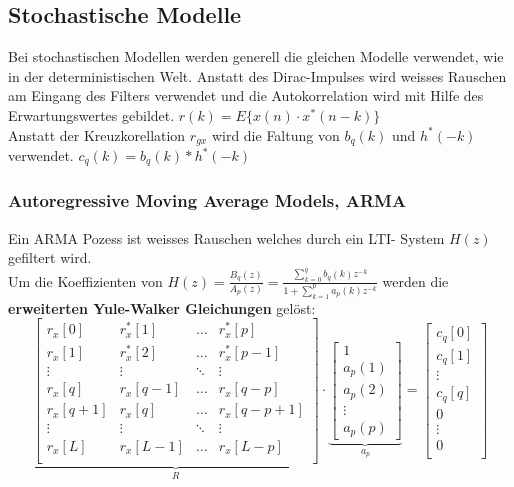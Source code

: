 \subsection{Stochastische Modelle}
Bei stochastischen Modellen werden generell die gleichen Modelle verwendet, wie in der deterministischen Welt. 
Anstatt des Dirac-Impulses wird weisses Rauschen am Eingang des Filters verwendet und die Autokorrelation wird mit Hilfe des Erwartungswertes gebildet. 
$r(k)=E\{x(n) \cdot x^*(n-k)\}$\\
Anstatt der Kreuzkorellation $r_{gx}$ wird die Faltung von $b_q(k)$ und $h^*(-k)$ verwendet. $c_q(k) = b_q(k) \ast h^*(-k)$

\subsubsection{Autoregressive Moving Average Models, ARMA }
Ein ARMA Pozess ist weisses Rauschen welches durch ein LTI- System $H(z)$ gefiltert wird.\\
Um die Koeffizienten von $H(z)=\frac{B_q(z)}{A_p(z)}=\frac{\sum\limits_{k=0}^q b_q(k)z^{-k}}{1+\sum\limits_{k=1}^p a_p(k)z^{-k}}$ werden 
die \textbf{erweiterten Yule-Walker Gleichungen} gelöst:
\small$$
\underbrace{\begin{bmatrix}               
    		r_x[0] & r_x^*[1] & \hdots & r_x^*[p] \\   
    		r_x[1] & r_x^*[2] & \hdots & r_x^*[p-1] \\   
    		\vdots & \vdots & \ddots & \vdots \\     
    		r_x[q] & r_x[q-1] & \hdots & r_x[q-p] \\   
    		r_x[q+1] & r_x[q] & \hdots & r_x[q-p+1] \\    
    		\vdots & \vdots & \ddots & \vdots \\     
    		r_x[L] & r_x[L-1] & \hdots & r_x[L-p] \\ 
		\end{bmatrix}  }_{R} \cdot \underbrace{\begin{bmatrix}
    		1\\
    		a_p(1) \\
    		a_p(2) \\
    		\vdots \\
    		a_p(p)
		\end{bmatrix}  }_{a_p}= \begin{bmatrix}
    		 c_q[0]\\            
    		 c_q[1]\\
    		\vdots \\
    		 c_q[q]\\
    		 0\\
    		\vdots \\
    		 0\\
		\end{bmatrix} 
		 $$ \normalsize

